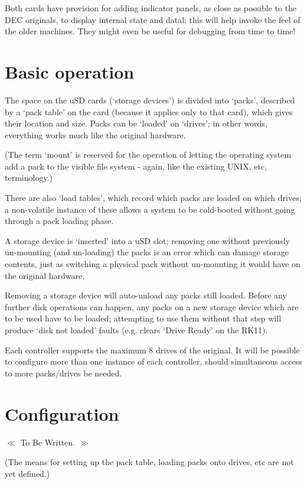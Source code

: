 Both cards have provision for adding indicator panels, as close as possible
to the DEC originals, to display internal state and datal; this will help
invoke the feel of the older machines. They might even be useful for
debugging from time to time!

\section{Basic operation}

The space on the uSD cards (`storage devices') is divided into `packs',
described by a `pack table' on the card (because it applies only to that
card), which gives their location and size. Packs can be `loaded' on
`drives'; in other words, everything works much like the original hardware.

(The term `mount' is reserved for the operation of letting the operating
system add a pack to the visible file system - again, like the existing UNIX,
etc, terminology.)

There are also `load tables', which record which packs are loaded on which
drives; a non-volatile instance of these allows a system to be cold-booted
without going through a pack loading phase.

A storage device is `inserted' into a uSD slot; removing one without
previously un-mounting (and un-loading) the packs is an error which can
damage storage contents, just as switching a physical pack without
un-mounting it would have on the original hardware.

Removing a storage device will auto-unload any packs still loaded. Before any
further disk operations can happen, any packs on a new storage device which
are to be used have to be loaded; attempting to use them without that step
will produce `disk not loaded' faults (e.g. clears `Drive Ready' on the RK11).

Each controller supports the maximum 8 drives of the original. It will be
possible to configure more than one instance of each controller, should
simultaneous access to more packs/drives be needed.

\section{Configuration}

\begin{center}
  $\ll$ To Be Written. $\gg$
\end{center}

(The means for setting up the pack table, loading packs onto drives, etc are
not yet defined.) 

